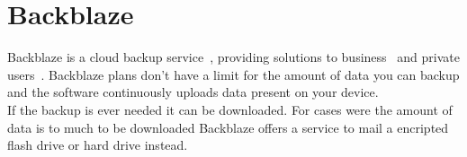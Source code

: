 \section{Backblaze}

Backblaze is a cloud backup service~\cite{www-hid-sp18-601-bblaze-about}, 
providing solutions to business~\cite{www-hid-sp18-601-bblaze-business} and 
private users~\cite{www-hid-sp18-601-bblaze-personal}. Backblaze plans don't 
have a limit for the amount of data you can backup and the software continuously 
uploads data present on your device. \\

If the backup is ever needed it can be downloaded. For cases were the amount of 
data is to much to be downloaded Backblaze offers a service to mail a encripted 
flash drive or hard drive instead.